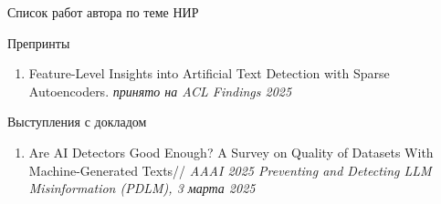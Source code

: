 \documentclass{beamer}
\begin{document}
\begin{frame}{Список работ автора по теме НИР}
        \begin{block}{Препринты}
        \begin{enumerate}
            \item Feature-Level Insights into Artificial Text Detection with Sparse Autoencoders. \textit{принято на ACL Findings 2025}
        \end{enumerate}
    \end{block}
    \begin{block}{Выступления с докладом}
        \begin{enumerate}
            \item Are AI Detectors Good Enough? A Survey on Quality of Datasets With Machine-Generated Texts// \textit{AAAI 2025 Preventing and Detecting LLM Misinformation (PDLM), 3 марта 2025}
        \end{enumerate}
    \end{block}
\end{frame}
\end{document}
